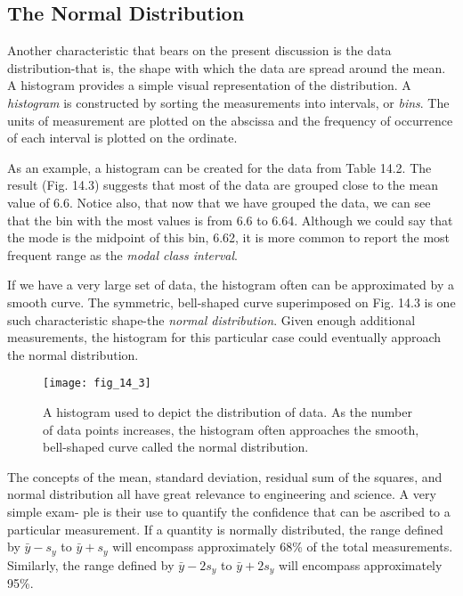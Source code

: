 \documentclass[../main.tex]{subfiles}
\begin{document}
\label{cha:cha_P_14_1_2}
\subsection{The Normal Distribution}

\noindent Another characteristic that bears on the present discussion is the data distribution-that is,
the shape with which the data are spread around the mean. A histogram provides a simple
visual representation of the distribution. A \textit{histogram} is constructed by sorting the measurements into intervals, or \textit{bins}. The units of measurement are plotted on the abscissa and
the frequency of occurrence of each interval is plotted on the ordinate.

As an example, a histogram can be created for the data from Table 14.2. The result
(Fig. 14.3) suggests that most of the data are grouped close to the mean value of 6.6.
Notice also, that now that we have grouped the data, we can see that the bin with the most
values is from 6.6 to 6.64. Although we could say that the mode is the midpoint of this bin,
6.62, it is more common to report the most frequent range as the \textit{modal class interval}.

If we have a very large set of data, the histogram often can be approximated by a
smooth curve. The symmetric, bell-shaped curve superimposed on Fig. 14.3 is one such
characteristic shape-the \textit{normal distribution}. Given enough additional measurements, the
histogram for this particular case could eventually approach the normal distribution.


\begin{figure}[H]
	\centering
	\texttt{[image: fig\_14\_3]}
	\caption{\textsf{A histogram used to depict the distribution of data. As the number of data points increases, the
	histogram often approaches the smooth, bell-shaped curve called the normal distribution.}}
	\label{fig:fig_14_3}
\end{figure}

The concepts of the mean, standard deviation, residual sum of the squares, and normal distribution all have great relevance to engineering and science. A very simple exam-
ple is their use to quantify the confidence that can be ascribed to a particular measurement.
If a quantity is normally distributed, the range defined by $\bar{y} - s_y$ to $\bar{y} + s_y$ will encompass
approximately 68\% of the total measurements. Similarly, the range defined by $\bar{y} -  2s_y$ to
$\bar{y} + 2s_ y$ will encompass approximately 95\%.
\end{document}
